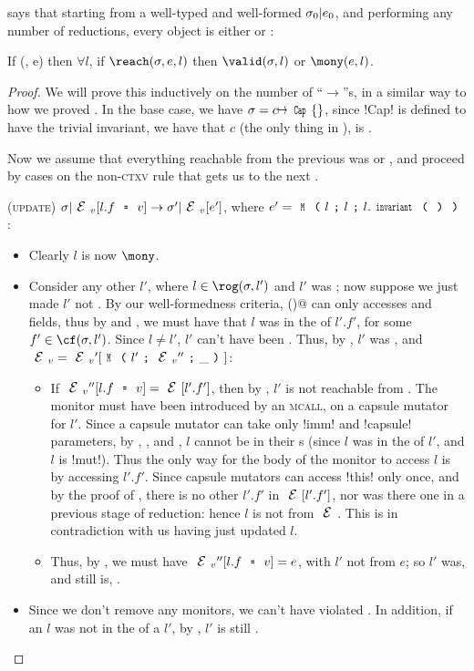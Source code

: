  says that starting from a well-typed and well-formed $\sigma_0|e_0$, and performing any number of reductions, every \reach object is either \valid or \mony:%
\SS\begin{theorem}\rm
If \VS(\s, e) then $\forall l$, if $\reach(\s, e, l)$ then $\valid(\s, l)$ or $\mony(e, l)$.
\end{theorem}\SS
\begin{proof}
We will prove this inductively on the number of ``$\rightarrow$''s, in a similar way to how we proved .
In the base case, we have $\s = c\mapsto\Kw{Cap}\{\}$, since \Q!Cap! is defined to have the trivial invariant, we have that $c$ (the only thing in \s), is \valid.

Now we assume that everything reachable from the previous \VS was \valid or \mony, and proceed by cases on the non-\textsc{ctxv} rule that gets us to the next \VS.
\begin{ienumerate}

	\item (\textsc{update}) $\s|\EV[l.f\equals v]\rightarrow \s'|\EV[e']$, where  $e'=\M{l}{l}{l.\invariant}$:
	\begin{itemize}
		\item Clearly $l$ is now $\mony$.
		\item Consider any other $l'$, where $l \in \rog(\s,l')$ and $l'$ was \valid; now suppose we just made $l'$ not \valid. By our well-formedness criteria, \Q@invariant()@ can only accesses \Q@imm@ and \Q@capsule@ fields, thus by  and , we must have that $l$ was in the \rog of $l'.f'$, for some $f' \in \cf(\s, l')$. Since $l \neq l'$, $l'$ can't have been \WE. Thus, by , $l'$ was \HNO, and $\EV = \EV'[\M{l'}{\EV''}{\_}]$:
		\begin{itemize}
			\item If $\EV''[l.f \equals v] = \E[l'.f']$, then by \HNO, $l'$ is not reachable from \E. The monitor must have been introduced by an \textsc{mcall}, on a capsule mutator for $l'$. Since a capsule mutator can take only \Q!imm! and \Q!capsule! parameters, by , , and , $l$ cannot be in their \rog{}s (since $l$ was in the \rog of $l'$, and $l$ is \Q!mut!). Thus the only way for the body of the monitor to access $l$ is by accessing $l'.f'$.
			Since capsule mutators can access \Q!this! only once, and by the proof of , there is no other $l'.f'$ in $\E[l'.f']$, nor was there one in a previous stage of reduction: hence $l$ is not \reach from $\E$. This is in contradiction with us having just updated $l$.
			\item Thus, by \HNO, we must have $\EV''[l.f \equals v] = e$, with $l'$ not \reach from $e$; so $l'$ was, and still is, \mony.
		\end{itemize}
		\item Since we don't remove any monitors, we can't have violated \mony. In addition, if an $l$ was not in the \rog of a \valid $l'$, by , $l'$ is still \valid.
	\end{itemize}


\end{ienumerate}
\end{proof}

